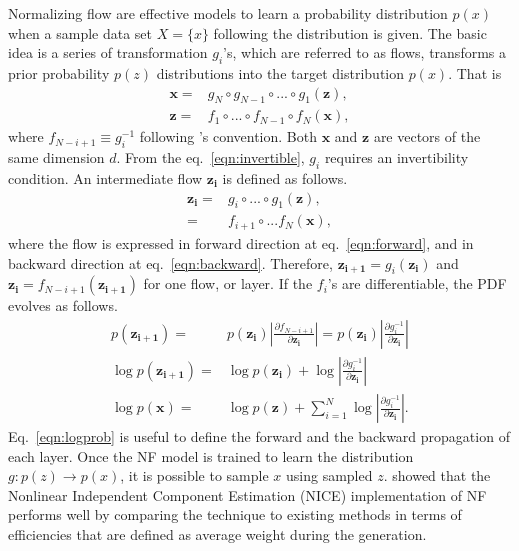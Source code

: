     Normalizing flow are effective models to learn a probability distribution $p(x)$ when a sample data set $X=\{x\}$ following the distribution is given. The basic idea is a series of transformation $g_i$'s, which are referred to as flows, transforms a prior probability $p(z)$ distributions into the target distribution $p(x)$. That is
    \begin{align}
        \mathbf{x} =& g_N \circ g_{N-1}\circ ... \circ g_1 (\mathbf{z}), \\
        \mathbf{z} =& f_1 \circ ... \circ f_{N-1} \circ f_N (\mathbf{x}), \label{eqn:invertible}
    \end{align}
    where $f_{N-i+1}\equiv g_i^{-1}$ following \parencite{Kobyzev2021NormalizingMethods}'s convention. Both $\mathbf{x}$ and $\mathbf{z}$ are vectors of the same dimension $d$. From the eq.~\ref{eqn:invertible}, $g_i$ requires an invertibility condition. An intermediate flow $\mathbf{z_i}$ is defined as follows.
    \begin{align}
    \mathbf{z_i} =&g_i \circ ... \circ g_1(\mathbf{z}), \label{eqn:forward}\\
        =&f_{i+1}\circ ...f_N(\mathbf{x}), \label{eqn:backward}
    \end{align}
    where the flow is expressed in forward direction at eq.~\ref{eqn:forward}, and in backward direction at eq.~\ref{eqn:backward}. Therefore, $\mathbf{z_{i+1}}=g_i (\mathbf{z_i})$ and $\mathbf{z_i} = f_{N-i+1}(\mathbf{z_{i+1}})$ for one flow, or layer. If the $f_i$'s are differentiable, the PDF evolves as follows.
    \begin{align}
     p(\mathbf{z_{i+1}})=& p(\mathbf{z_i})|\frac{\partial f_{N-i+1}}{\partial \mathbf{z_i}}| =p(\mathbf{z_i})|\frac{\partial g_{i}^{-1}}{\partial \mathbf{z_i}}|\\
     \log p(\mathbf{z_{i+1}}) =& \log p(\mathbf{z_i}) + \log|\frac{\partial g_i^{-1}}{\partial \mathbf{z_i}}| \label{eqn:logprob}\\
     \log p(\mathbf{x}) =& \log p(\mathbf{z}) + \sum\limits_{i=1}^N \log|\frac{\partial g_i^{-1}}{\partial \mathbf{z_i}}|.
    \end{align}
    Eq.~\ref{eqn:logprob} is useful to define the forward and the backward propagation of each layer.
    Once the NF model is trained to learn the distribution $g: p(z)\rightarrow p(x)$, it is possible to sample $x$ using sampled $z$. \parencite{Gao2020EventFlows} showed that the Nonlinear Independent Component Estimation (NICE) \parencite{Dinh2014NICE:Estimation} implementation of NF performs well by comparing the technique to existing methods in terms of efficiencies that are defined as average weight during the generation.

